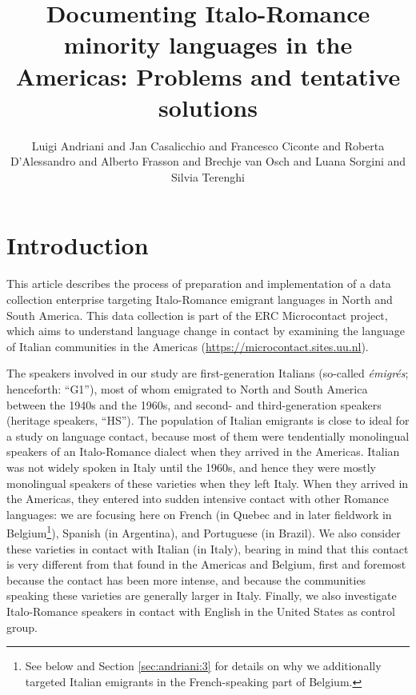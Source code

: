 \documentclass[output=paper,hidelinks]{langscibook}
\author{Luigi Andriani\affiliation{Utrecht University, UiL-OTS} and Jan Casalicchio\affiliation{University of Palermo} and Francesco Ciconte\affiliation{University of Insubria} and Roberta D’Alessandro\affiliation{Utrecht University, UiL-OTS} and Alberto Frasson\affiliation{Utrecht University, UiL-OTS} and Brechje van Osch\affiliation{University of Tromsø} and Luana Sorgini\affiliation{Utrecht University, UiL-OTS} and Silvia Terenghi\affiliation{Utrecht University, UiL-OTS}}
\title{Documenting Italo-Romance minority languages in the Americas: Problems and tentative solutions}
\begin{document}
\maketitle

\section{Introduction}\label{sec:andriani:1}

This article describes the process of preparation and implementation of a data collection enterprise targeting Italo-Romance emigrant languages in North and South America. This data collection is part of the ERC Microcontact project, which aims to understand language change in contact by examining the language of Italian communities in the Americas (\url{https://microcontact.sites.uu.nl}).

The speakers involved in our study are first-generation Italians (so-called \textit{émigrés}; henceforth: ``G1''), most of whom emigrated to North and South America between the 1940s and the 1960s, and second- and third-generation speakers (heritage speakers, ``HS''). The population of Italian emigrants is close to ideal for a study on language contact, because most of them were tendentially monolingual speakers of an Italo-Romance dialect when they arrived in the Americas. Italian was not widely spoken in Italy until the 1960s, and hence they were mostly monolingual speakers of these varieties when they left Italy. When they arrived in the Americas, they entered into sudden intensive contact with other Romance languages: we are focusing here on French (in Quebec and in later fieldwork in Belgium\footnote{See below and Section \ref{sec:andriani:3} for details on why we additionally targeted Italian emigrants in the French-speaking part of Belgium.}), Spanish (in Argentina), and Portuguese (in Brazil). We also consider these varieties in contact with Italian (in Italy), bearing in mind that this contact is very different from that found in the Americas and Belgium, first and foremost because the contact has been more intense, and because the communities speaking these varieties are generally larger in Italy. Finally, we also investigate Italo-Romance speakers in contact with English in the United States as control group.
\end{document}
